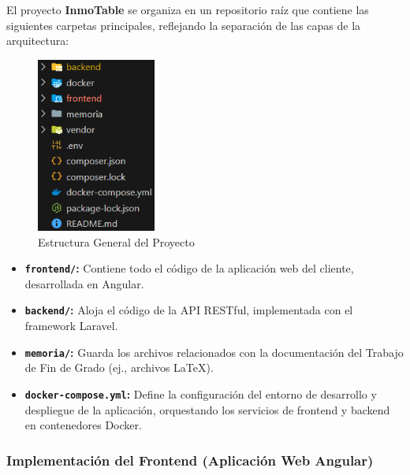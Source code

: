 El proyecto \textbf{InmoTable} se organiza en un repositorio raíz que contiene las siguientes carpetas principales, reflejando la separación de las capas de la arquitectura:

\begin{figure}[H]
    \begin{center}
        \includegraphics[width = 0.35\textwidth]{Figuras/directoriosestructurageneralproyecto.png}
    \end{center}
    \caption{\label{fig:directoriosestructurageneralproyecto} Estructura General del Proyecto}
\end{figure}

\begin{itemize}
    \item \textbf{\texttt{frontend/}:} Contiene todo el código de la aplicación web del cliente, desarrollada en Angular.

    \item \textbf{\texttt{backend/}:} Aloja el código de la API RESTful, implementada con el framework Laravel.

    \item \textbf{\texttt{memoria/}:} Guarda los archivos relacionados con la documentación del Trabajo de Fin de Grado (ej., archivos LaTeX).

    \item \textbf{\texttt{docker-compose.yml}:} Define la configuración del entorno de desarrollo y despliegue de la aplicación, orquestando los servicios de frontend y backend en contenedores Docker.
\end{itemize}

\clearpage


\subsubsection{Implementación del Frontend (Aplicación Web Angular)}


